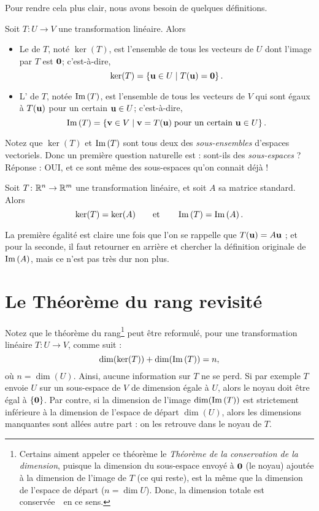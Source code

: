 Pour rendre cela plus clair, nous avons besoin de quelques définitions.

\begin{definition}
Soit $T \colon U \to V$ une transformation linéaire.  Alors
\begin{itemize}
\item Le  de $T$, noté $\ker(T)$, est l'ensemble de tous les vecteurs de $U$ dont l'image par $T$ est $\mathbf{0}$;
c'est-à-dire,
$$
\ker(T) = \{ \mathbf{u} \in U \mid T(\mathbf{u}) = \mathbf{0}\}\,.
$$
\item L' de $T$, notée $\operatorname{Im}\,(T)$, est l'ensemble de tous les
vecteurs de $V$ qui sont égaux à $T(\mathbf{u})$ pour un certain $\mathbf{u} \in U$;
c'est-à-dire,
$$
\operatorname{Im}\,(T) = \{ \mathbf{v} \in V \mid \mathbf{v} = T(\mathbf{u}) \; \textrm{pour un certain $\mathbf{u}\in U$}\}\,.
$$
\end{itemize}
\end{definition}

Notez que $\ker(T)$ et $\operatorname{Im}\,(T)$ sont tous deux des \emph{sous-ensembles} d'espaces vectoriels. Donc
un première question naturelle est : sont-ils des \emph{sous-espaces} ?  Réponse :  OUI,
et ce sont même des sous-espaces qu'on connait déjà !

\begin{theorem}
Soit $T \colon \mathbb{R}^n \to \mathbb{R}^m$ une transformation linéaire, et soit $A$ sa 
matrice standard.  Alors
$$
\ker(T) = \ker(A) \qquad \textrm{et} \qquad \operatorname{Im}\,(T) = \operatorname{Im}\,(A)\,.
$$
\end{theorem}

La première égalité est claire une fois que l'on se rappelle que $T(\mathbf{u}) = A\mathbf{u}$ ;
et pour la seconde, il faut retourner en arrière et chercher la définition originale de
$\operatorname{Im}\,(A)$, mais ce n'est pas très dur non plus.

\section{Le Théorème du rang revisit\'e}

Notez que le théorème du rang\footnote{Certains aiment appeler ce théorème le {\it Théorème de la conservation de la dimension}, puisque la dimension du sous-espace envoyé à $\mathbf{0}$ (le noyau) ajoutée à la dimension de l'image de $T$ (ce qui reste), est la même que la dimension de l'espace de départ ($n=\dim U$). Donc, \og la dimension totale est conservée\ \fg\ en ce sens.} peut \^etre reformul\'e, pour
une transformation linéaire $T \colon U \to V$, comme suit :
$$
\dim(\ker(T)) + \dim(\operatorname{Im}\,(T)) = n,
$$
où $n = \dim(U)$. Ainsi, aucune information sur $T$ ne se perd.
Si par exemple $T$ envoie $U$ sur un sous-espace de $V$ de dimension
égale à $U$, alors le noyau doit être égal à $\{\mathbf{0}\}$.
Par contre, si la dimension de l'image $\dim(\operatorname{Im}\,(T))$ est strictement inférieure à la dimension de l'espace de départ $\dim (U)$, alors les dimensions manquantes sont allées autre part : on les retrouve dans le noyau de $T$. \\

